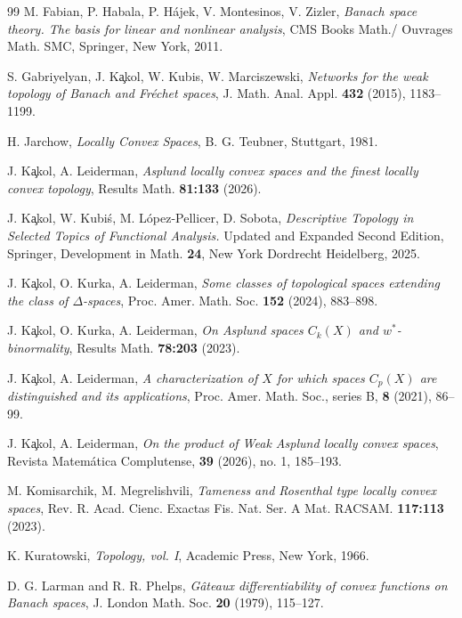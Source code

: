 \documentclass[12pt]{amsart}
\theoremstyle{plain}
\theoremstyle{definition}
\theoremstyle{remark}
\begin{document}
\begin{thebibliography}{99}
  M. Fabian, P. Habala, P. H\'ajek, V. Montesinos, V. Zizler,
\newblock \textit{Banach space theory. The basis for linear and nonlinear analysis},
CMS Books Math./ Ouvrages Math. SMC, Springer, New York, 2011.

 S. Gabriyelyan, J. K\c akol, W. Kubis, W. Marciszewski,
\textit{Networks for the weak topology of Banach and  Fr\'echet spaces}, J. Math. Anal. Appl. \textbf{432} (2015), 1183--1199.

 H. Jarchow,
 \textit{Locally Convex Spaces}, B. G. Teubner, Stuttgart, 1981.

 J. K\c akol, A. Leiderman,
 \textit{Asplund locally convex spaces and the finest locally convex topology}, Results Math. \textbf{81:133} (2026).

 J. K{\c{a}}kol, W. Kubi\'{s}, M.  L\'{o}pez-Pellicer,  D. Sobota,
\textit{Descriptive Topology in Selected Topics of Functional Analysis.} Updated and Expanded Second Edition,
Springer, Development in Math. \textbf{24}, New York Dordrecht Heidelberg, 2025.

 J. K\c akol, O. Kurka, A. Leiderman,
\newblock \textit{Some classes of topological spaces extending the class of $\Delta$-spaces},
Proc. Amer. Math. Soc. \textbf{152} (2024), 883--898.

 J. K\c akol, O. Kurka, A. Leiderman,
\newblock \textit{On Asplund spaces $C_k(X)$ and $w^{*}$-binormality},
Results Math. \textbf{78:203} (2023).

  J. K\c akol, A.  Leiderman,
\newblock \textit{A  characterization of $X$ for  which  spaces $C_p(X)$ are distinguished and its applications},
 Proc. Amer. Math. Soc., series B, \textbf{8} (2021), 86--99.

 J. K\c akol, A. Leiderman,
\textit{On the product of Weak Asplund locally convex spaces},
 Revista Matem\'atica Complutense, \textbf{39} (2026), no. 1, 185--193.


 M. Komisarchik, M. Megrelishvili,
 \textit{Tameness and Rosenthal type locally convex spaces},
 Rev. R. Acad. Cienc. Exactas Fis. Nat. Ser. A Mat. RACSAM. \textbf{117:113} (2023).

  K. Kuratowski,
 \textit{Topology, vol. I}, Academic Press, New York, 1966.

 D. G. Larman and R. R. Phelps,
\newblock \textit{G\^ ateaux differentiability of convex functions on Banach spaces},
J. London Math. Soc. \textbf{20} (1979), 115--127.


\end{thebibliography}
\end{document}
